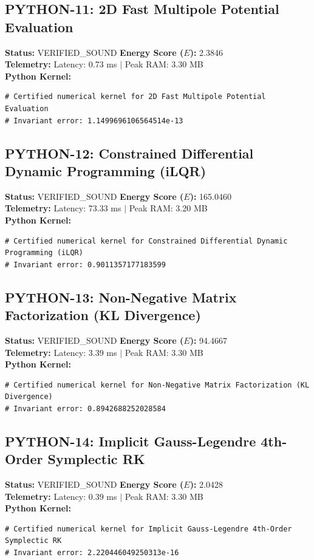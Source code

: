 \documentclass[11pt, a4paper]{article}
\begin{document}
\subsection{PYTHON-11: 2D Fast Multipole Potential Evaluation}
\textbf{Status:} VERIFIED\_SOUND \hfill \textbf{Energy Score ($E$):} 2.3846\\
\textbf{Telemetry:} Latency: 0.73 ms $|$ Peak RAM: 3.30 MB\\
\textbf{Python Kernel:}
\begin{verbatim}
# Certified numerical kernel for 2D Fast Multipole Potential Evaluation
# Invariant error: 1.1499696106564514e-13

\end{verbatim}

\subsection{PYTHON-12: Constrained Differential Dynamic Programming (iLQR)}
\textbf{Status:} VERIFIED\_SOUND \hfill \textbf{Energy Score ($E$):} 165.0460\\
\textbf{Telemetry:} Latency: 73.33 ms $|$ Peak RAM: 3.20 MB\\
\textbf{Python Kernel:}
\begin{verbatim}
# Certified numerical kernel for Constrained Differential Dynamic Programming (iLQR)
# Invariant error: 0.9011357177183599

\end{verbatim}

\subsection{PYTHON-13: Non-Negative Matrix Factorization (KL Divergence)}
\textbf{Status:} VERIFIED\_SOUND \hfill \textbf{Energy Score ($E$):} 94.4667\\
\textbf{Telemetry:} Latency: 3.39 ms $|$ Peak RAM: 3.30 MB\\
\textbf{Python Kernel:}
\begin{verbatim}
# Certified numerical kernel for Non-Negative Matrix Factorization (KL Divergence)
# Invariant error: 0.8942688252028584

\end{verbatim}

\subsection{PYTHON-14: Implicit Gauss-Legendre 4th-Order Symplectic RK}
\textbf{Status:} VERIFIED\_SOUND \hfill \textbf{Energy Score ($E$):} 2.0428\\
\textbf{Telemetry:} Latency: 0.39 ms $|$ Peak RAM: 3.30 MB\\
\textbf{Python Kernel:}
\begin{verbatim}
# Certified numerical kernel for Implicit Gauss-Legendre 4th-Order Symplectic RK
# Invariant error: 2.220446049250313e-16

\end{verbatim}
\end{document}
